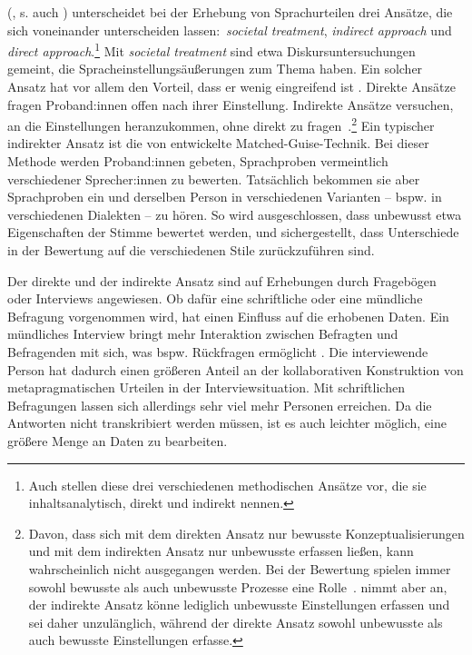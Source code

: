 \citeauthor{Garrett2005} (\citeyear{Garrett2005}, s. auch  \citealp[37]{Garrett.2012}) unterscheidet bei der Erhebung von Sprach\-ur\-tei\-len drei Ans{\"a}tze, die sich voneinander unterscheiden lassen:~\textit{societal treatment}, \textit{indirect approach} und \textit{direct approach}.\footnote{Auch \citet[212--213]{Cargile.1994} stellen diese drei verschiedenen methodischen Ans{\"a}tze vor, die sie inhaltsanalytisch, direkt und indirekt nennen.} 
Mit \textit{societal treatment} sind etwa Diskursuntersuchungen gemeint, die %
Spracheinstellungsäußerungen %
zum Thema haben. 
Ein solcher Ansatz hat vor allem den Vorteil, dass er wenig eingreifend ist \citep[s.][52]{Garrett.2012}. 
Direkte Ans{\"a}tze fragen Proband:innen offen nach ihrer Einstellung. 
Indirekte Ans{\"a}tze versuchen, an die Einstellungen heranzukommen, ohne direkt zu fragen~\citep[s.][]{Garrett2005}.\footnote{Davon, dass sich mit dem direkten Ansatz nur bewusste Konzeptualisierungen und mit dem indirekten Ansatz nur unbewusste erfassen lie{\ss}en, kann wahrscheinlich nicht ausgegangen werden. 
Bei der Bewertung spielen immer sowohl bewusste als auch unbewusste Prozesse eine Rolle~\citep[s.][4--5]{Preston2010b}. 
\citet[178--179]{Studler.2014} nimmt aber an, der indirekte Ansatz k{\"o}nne lediglich unbewusste Einstellungen erfassen und sei daher unzul{\"a}nglich, w{\"a}hrend der direkte Ansatz sowohl unbewusste als auch bewusste Einstellungen erfasse.}
Ein typischer indirekter Ansatz ist die von \citet{Lambert.1960} entwickelte Matched-Guise-Technik. Bei dieser Methode werden Proband:innen gebeten, Sprachproben vermeintlich verschiedener Sprecher:innen zu bewerten. Tatsächlich bekommen sie aber Sprachproben ein und derselben Person in verschiedenen Varianten -- bspw. in verschiedenen Dialekten -- zu hören. So wird ausgeschlossen, dass unbewusst etwa Eigenschaften der Stimme bewertet werden, und sichergestellt, dass Unterschiede in der Bewertung auf die verschiedenen Stile zurückzuführen sind. 

Der direkte und der indirekte Ansatz sind auf Erhebungen durch Fragebögen oder Interviews angewiesen. 
Ob dafür eine schriftliche oder eine mündliche Befragung vorgenommen wird, hat einen Einfluss auf die erhobenen Daten. 
Ein mündliches Interview bringt mehr Interaktion zwischen Befragten und Befragenden mit sich, was bspw. Rückfragen ermöglicht \citep[s.][1255]{Garrett2005}. 
Die interviewende Person hat dadurch einen größeren Anteil an der kollaborativen Konstruktion von metapragmatischen Urteilen in der Interviewsituation. 
Mit schriftlichen Befragungen lassen sich allerdings sehr viel mehr Personen erreichen. 
Da die Antworten nicht transkribiert werden müssen, ist es auch leichter möglich, eine größere Menge an Daten zu bearbeiten. 

